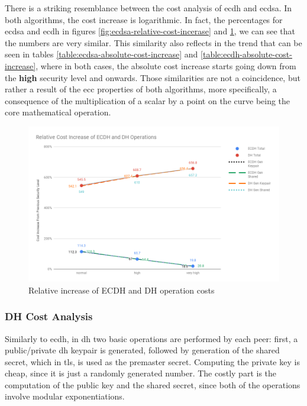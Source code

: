 There is a striking resemblance between the cost analysis of \gls{ecdh} and \gls{ecdsa}. In both algorithms, the cost increase is logarithmic.
In fact, the percentages for \gls{ecdsa} and \gls{ecdh} in figures \ref{fig:ecdsa-relative-cost-incerase}
and \ref{fig:ecdh-dh-relative-cost-increase}, we can see that the numbers are very similar. This similarity also reflects in the
trend that can be seen in tables \ref{table:ecdsa-absolute-cost-increase} and \ref{table:ecdh-absolute-cost-increase}, where in both cases, the
absolute cost increase starts going down from the \textbf{high} security level and onwards. Those similarities are not a coincidence, but rather
a result of the \gls{ecc} properties of both algorithms, more specifically, a consequence of the multiplication of a scalar by a point on
the curve being the core mathematical operation.

  \begin{figure}
    \centering
    \includegraphics[width=1.0\textwidth]{img/ecdh_dh_relative_cost_increase.png}
    \centering \caption{\label{fig:ecdh-dh-relative-cost-increase} Relative increase of ECDH and DH operation costs}
  \end{figure}

\subsubsection{DH Cost Analysis}

Similarly to \gls{ecdh}, in \gls{dh} two basic operations are performed by each peer: first, a public/private \gls{dh} keypair is generated, followed
by generation of the shared secret, which in \gls{tls}, is used as the premaster secret. Computing the private key is cheap, since it is just a randomly
generated number. The costly part is the computation of the public key and the shared secret, since both of the operations involve modular exponentiations.

